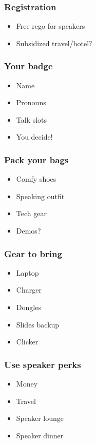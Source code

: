 \documentclass{beamer}
\begin{document}
\begin{frame}[fragile]
\frametitle{Registration}
\begin{itemize}[<+(1)->]
\item Free rego for speakers
\item Subsidized travel/hotel$?$
\end{itemize}
\end{frame}

\begin{frame}[fragile]
\frametitle{Your badge}
\begin{itemize}[<+(1)->]
\item Name
\item Pronouns
\item Talk slots
\item You decide!
\end{itemize}
\end{frame}

\begin{frame}[fragile]
\frametitle{Pack your bags}
\begin{itemize}[<+(1)->]
\item Comfy shoes
\item Speaking outfit
\item Tech gear
\item Demos$?$
\end{itemize}
\end{frame}

\begin{frame}[fragile]
\frametitle{Gear to bring}
\begin{itemize}[<+(1)->]
\item Laptop
\item Charger
\item Dongles
\item Slides backup
\item Clicker
\end{itemize}
\end{frame}


\begin{frame}[fragile]
\frametitle{Use speaker perks}
\begin{itemize}[<+(1)->]
\item Money
\item Travel
\item Speaker lounge
\item Speaker dinner
\end{itemize}
\end{frame}
\end{document}
